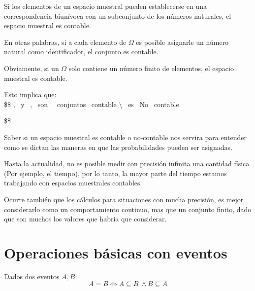 \documentclass[
  letterpaper,
  DIV=11,
  numbers=noendperiod]{scrreprt}
\begin{document}
\begin{tcolorbox}[enhanced jigsaw, arc=.35mm, bottomrule=.15mm, bottomtitle=1mm, breakable, colback=white, colbacktitle=quarto-callout-tip-color!10!white, colframe=quarto-callout-tip-color-frame, coltitle=black, left=2mm, leftrule=.75mm, opacityback=0, opacitybacktitle=0.6, rightrule=.15mm, title={Identificación de un conjunto contable}, titlerule=0mm, toprule=.15mm, toptitle=1mm]

Si los elementos de un espacio muestral pueden establecerse en una
correspondencia biunívoca con un subconjunto de los números naturales,
el espacio muestral es contable.

En otras palabras, si a cada elemento de \(\Omega\) es posible asignarle
un número natural como identificador, el conjunto es contable.

Obviamente, si un \(\Omega\) solo contiene un número finito de
elementos, el espacio muestral es contable.

\end{tcolorbox}

Esto implica que:\\
\$\$ ,  ~y ~, ~son ~~conjuntos ~contable
\textbackslash{}  ~es ~No ~contable

\$\$

Saber si un espacio muestral es contable o no-contable nos servira para
entender como se dictan las maneras en que las probabilidades pueden ser
asignadas.

Hasta la actualidad, no es posible medir con precisión infinita una
cantidad física (Por ejemplo, el tiempo), por lo tanto, la mayor parte
del tiempo estamos trabajando con espacios muestrales contables.

Ocurre también que los cálculos para situaciones con mucha precisión, es
mejor considerarlo como un comportamiento continuo, mas que un conjunto
finito, dado que son muchos los valores que habria que considerar.

\section{Operaciones básicas con
eventos}\label{operaciones-buxe1sicas-con-eventos}

\begin{tcolorbox}[enhanced jigsaw, arc=.35mm, bottomrule=.15mm, bottomtitle=1mm, breakable, colback=white, colbacktitle=quarto-callout-note-color!10!white, colframe=quarto-callout-note-color-frame, coltitle=black, left=2mm, leftrule=.75mm, opacityback=0, opacitybacktitle=0.6, rightrule=.15mm, title={Igualdad}, titlerule=0mm, toprule=.15mm, toptitle=1mm]

Dados dos eventos \(A, B:\) \[
A = B \iff A \subseteq B \ \land B \subseteq A
\]

\end{tcolorbox}
\end{document}
